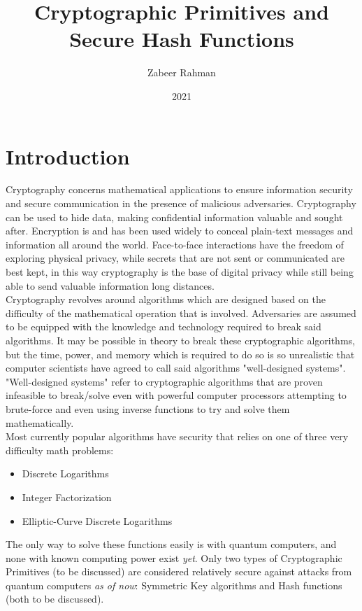 \documentclass[12pt]{extarticle}
\title{Cryptographic Primitives and Secure Hash Functions}
\author{Zabeer Rahman}
\date{2021}
\begin{document}
\begin{titlepage}
\maketitle
\end{titlepage}

\section{Introduction}
Cryptography concerns mathematical applications to ensure information security and secure communication in the presence of malicious adversaries. Cryptography can be used to hide data, making confidential information valuable and sought after. Encryption is and has been used widely to conceal plain-text messages and information all around the world. Face-to-face interactions have the freedom of exploring physical privacy, while secrets that are not sent or communicated are best kept, in this way cryptography is the base of digital privacy while still being able to send valuable information long distances.\\

Cryptography revolves around algorithms which are designed based on the difficulty of the mathematical operation that is involved. Adversaries are assumed to be equipped with the knowledge and technology required to break said algorithms. It may be possible in theory to break these cryptographic algorithms, but the time, power, and memory which is required to do so is so unrealistic that computer scientists have agreed to call said algorithms "well-designed systems". "Well-designed systems" refer to cryptographic algorithms that are proven infeasible to break/solve even with powerful computer processors attempting to brute-force and even using inverse functions to try and solve them mathematically.\cite{src2}\cite{src3}\\

Most currently popular algorithms have security that relies on one of three very difficulty math problems:
\begin{itemize}
  \item Discrete Logarithms
  \item Integer Factorization
  \item Elliptic-Curve Discrete Logarithms
\end{itemize}
The only way to solve these functions easily is with quantum computers, and none with known computing power exist {\slshape {yet}}. Only two types of Cryptographic Primitives (to be discussed) are considered relatively secure against attacks from quantum computers {\slshape{as of now}}: Symmetric Key algorithms and Hash functions (both to be discussed).\cite{src2}\cite{src4}\cite{src6}\\
\end{document}
